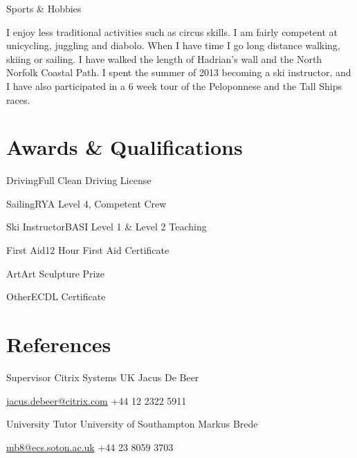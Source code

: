 \documentclass{tccv}
\begin{document}
\begin{eventlist}
    \item{}
         {}
         {Sports \& Hobbies}

    I enjoy less traditional activities such as circus skills. I am fairly competent at unicycling, juggling and diabolo. When I have time I go long distance walking, skiing or sailing. I have walked the length of Hadrian's wall and the North Norfolk Coastal Path. I spent the summer of 2013 becoming a ski instructor, and I have also participated in a 6 week tour of the Peloponnese and the Tall Ships races.

\end{eventlist}


\section{Awards \& Qualifications}

\begin{factlist}
\item{Driving}{Full Clean Driving License}
\item{Sailing}{RYA Level 4, Competent Crew}
\item{Ski Instructor}{BASI Level 1 \& Level 2 Teaching}
\item{First Aid}{12 Hour First Aid Certificate}
\item{Art}{Art Sculpture Prize}
\item{Other}{ECDL Certificate}
\end{factlist}


\section{References}

\begin{eventlist}

\item{Supervisor}
     {Citrix Systems UK}
     {Jacus De Beer}

\href{mailto:jacus.debeer@citrix.com}{jacus.debeer@citrix.com}
\newline
+44 12 2322 5911

\bigskip


\item{University Tutor}
     {University of Southampton}
     {Markus Brede}

\href{mailto:mb8@ecs.soton.ac.uk}{mb8@ecs.soton.ac.uk}
\newline
+44 23 8059 3703

\end{eventlist}
\end{document}

